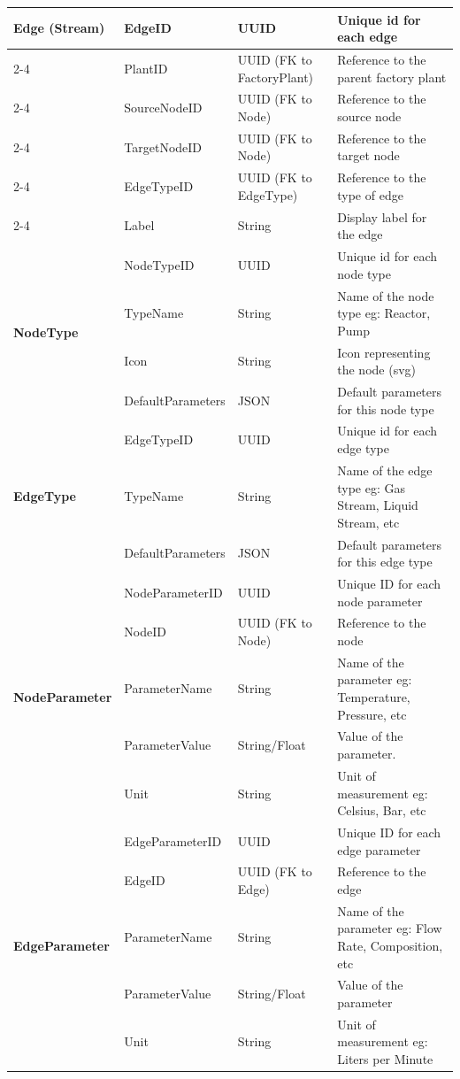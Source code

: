 \documentclass[12pt]{article}
\begin{document}
\begin{longtable}{|p{3.5cm}|p{3.25cm}|p{2cm}|p{6cm}|}
  \multirow{6}{*}{\textbf{Edge (Stream)}} & EdgeID & UUID & Unique id for each edge \\
  \cline{2-4}
  & PlantID & UUID (FK to FactoryPlant) & Reference to the parent factory plant \\
  \cline{2-4}
  & SourceNodeID & UUID (FK to Node) & Reference to the source node \\
  \cline{2-4}
  & TargetNodeID & UUID (FK to Node) & Reference to the target node \\
  \cline{2-4}
  & EdgeTypeID & UUID (FK to EdgeType) & Reference to the type of edge \\
  \cline{2-4}
  & Label & String & Display label for the edge \\
  \hline
  
  \multirow{4}{*}{\textbf{NodeType}} & NodeTypeID & UUID & Unique id for each node type \\
  \cline{2-4}
  & TypeName & String & Name of the node type eg: Reactor, Pump \\
  \cline{2-4}
  & Icon & String & Icon representing the node (svg) \\
  \cline{2-4}
  & DefaultParameters & JSON & Default parameters for this node type \\
  \hline
  
  \multirow{3}{*}{\textbf{EdgeType}} & EdgeTypeID & UUID & Unique id for each edge type \\
  \cline{2-4}
  & TypeName & String & Name of the edge type eg: Gas Stream, Liquid Stream, etc \\
  \cline{2-4}
  & DefaultParameters & JSON & Default parameters for this edge type \\
  \hline
  
  \multirow{5}{*}{\textbf{NodeParameter}} & NodeParameterID & UUID & Unique ID for each node parameter \\
  \cline{2-4}
  & NodeID & UUID (FK to Node) & Reference to the node \\
  \cline{2-4}
  & ParameterName & String & Name of the parameter eg: Temperature, Pressure, etc \\
  \cline{2-4}
  & ParameterValue & String/Float & Value of the parameter. \\
  \cline{2-4}
  & Unit & String & Unit of measurement eg: Celsius, Bar, etc \\
  \hline
  
  \multirow{5}{*}{\textbf{EdgeParameter}} & EdgeParameterID & UUID & Unique ID for each edge parameter \\
  \cline{2-4}
  & EdgeID & UUID (FK to Edge) & Reference to the edge \\
  \cline{2-4}
  & ParameterName & String & Name of the parameter eg: Flow Rate, Composition, etc \\
  \cline{2-4}
  & ParameterValue & String/Float & Value of the parameter \\
  \cline{2-4}
  & Unit & String & Unit of measurement eg: Liters per Minute \\
  \hline
  

\end{longtable}
\end{document}
